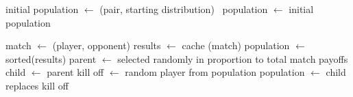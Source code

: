 \documentclass{article}
\begin{document}
  \begin{algorithmic}[1]
  \STATE initial population $\gets$ (pair, starting distribution) \
  \STATE population $\gets$ initial population

        \STATE match $\gets$ (player, opponent)
        \STATE results $\gets$ cache (match)
        \ENDFOR
      \ENDFOR
      \STATE population $\gets$ sorted(results)
      \STATE parent $\gets$ selected randomly in proportion to total match payoffs
      \STATE child $\gets$ parent
      \STATE kill off $\gets$ random player from population
      \STATE population $\gets$ child replaces kill off
    \ENDWHILE
  \end{algorithmic}
\end{document}
